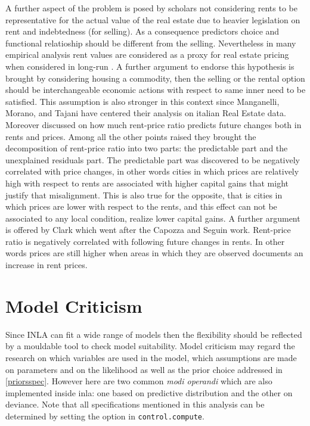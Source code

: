 \documentclass[
  12pt,
  a4paper,
  oneside]{book}
\newcommand{\passthrough}[1]{#1}
\theoremstyle{definition}
\theoremstyle{definition}
\theoremstyle{definition}
\theoremstyle{remark}
\begin{document}
A further aspect of the problem is posed by scholars not considering rents to be representative for the actual value of the real estate due to heavier legislation on rent and indebtedness (for selling). As a consequence predictors choice and functional relatioship should be different from the selling. Nevertheless in many empirical analysis rent values are considered as a proxy for real estate pricing when considered in long-run \citep{Herath_Maier_2011}. A further argument to endorse this hypothesis is brought by \citet{sellingVSrental} considering housing a commodity, then the selling or the rental option should be interchangeable economic actions with respect to same inner need to be satisfied. This assumption is also stronger in this context since Manganelli, Morano, and Tajani have centered their analysis on italian Real Estate data. Moreover \citet{Capozza_Seguin_1996} discussed on how much rent-price ratio predicts future changes both in rents and prices. Among all the other points raised they brought the decomposition of rent-price ratio into two parts: the predictable part and the unexplained residuals part. The predictable part was discovered to be negatively correlated with price changes, in other words cities in which prices are relatively high with respect to rents are associated with higher capital gains that might justify that misalignment. This is also true for the opposite, that is cities in which prices are lower with respect to the rents, and this effect can not be associated to any local condition, realize lower capital gains. A further argument is offered by Clark \citep{Clark_1995} which went after the Capozza and Seguin work. Rent-price ratio is negatively correlated with following future changes in rents. In other words prices are still higher when areas in which they are observed documents an increase in rent prices.

\hypertarget{criticism}{%
\section{Model Criticism}\label{criticism}}

Since INLA can fit a wide range of models then the flexibility should be reflected by a mouldable tool to check model suitability. Model criticism may regard the research on which variables are used in the model, which assumptions are made on parameters and on the likelihood as well as the prior choice addressed in \ref{priorsspec}. However here are two common \emph{modi operandi} which are also implemented inside inla: one based on predictive distribution and the other on deviance. Note that all specifications mentioned in this analysis can be determined by setting the option in \passthrough{\lstinline!control.compute!}.
\end{document}
